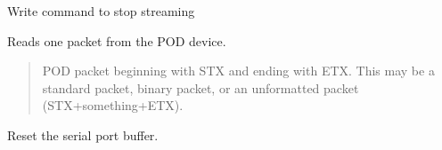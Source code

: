 \documentclass[letterpaper,10pt,english]{sphinxmanual}
\begin{document}
\begin{fulllineitems}
\begin{fulllineitems}
\end{fulllineitems}


\begin{fulllineitems}
\label{\detokenize{Morelia.Stream.Collect:Morelia.Stream.Collect.DeviceValve.Valve.Close}}
\pysigstartsignatures
{}
\pysigstopsignatures
\sphinxAtStartPar
Write command to stop streaming

\end{fulllineitems}


\begin{fulllineitems}
\label{\detokenize{Morelia.Stream.Collect:Morelia.Stream.Collect.DeviceValve.Valve.Drip}}
\pysigstartsignatures
{}
\pysigstopsignatures
\sphinxAtStartPar
Reads one packet from the POD device.
\begin{quote}\begin{description}
\sphinxAtStartPar
POD packet beginning with STX and ending with ETX.                 This may be a standard packet, binary packet, or an                 unformatted packet (STX+something+ETX).

\sphinxAtStartPar
{\hyperref[\detokenize{Morelia.Packets:Morelia.Packets.Packet.Packet}]{}}

\end{description}\end{quote}

\end{fulllineitems}


\begin{fulllineitems}
\label{\detokenize{Morelia.Stream.Collect:Morelia.Stream.Collect.DeviceValve.Valve.EmptyValve}}
\pysigstartsignatures
{}
\pysigstopsignatures
\sphinxAtStartPar
Reset the serial port buffer.


\end{fulllineitems}
\end{fulllineitems}
\end{document}
